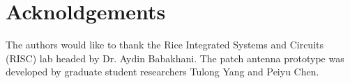 \documentclass[12pt, journal,draftcls,letterpaper,onecolumn]{IEEEtran}
\begin{document}
\section{Acknoldgements}
The authors would like to thank the Rice Integrated Systems and Circuits (RISC) lab headed by Dr. Aydin Babakhani.  The patch antenna prototype was developed by graduate student researchers Tulong  Yang and Peiyu Chen.    




































\ifCLASSOPTIONcaptionsoff
  \newpage
\fi









 
   
\end{document}
